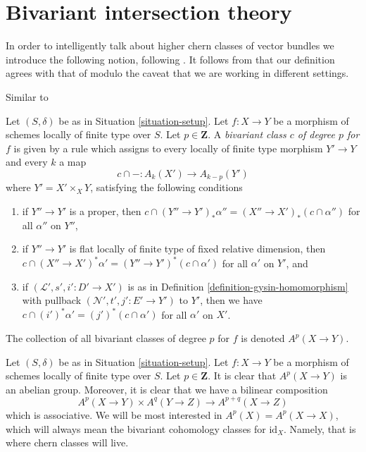 \section{Bivariant intersection theory}
\label{section-bivariant}

\noindent
In order to intelligently talk about higher chern classes of vector
bundles we introduce the following notion, following \cite{FM}.
It follows from \cite[Theorem 17.1]{F} that our definition agrees
with that of \cite{F} modulo the caveat that we are working in different
settings.

\begin{definition}
\label{definition-bivariant-class}
\begin{reference}
Similar to \cite[Definition 17.1]{F}
\end{reference}
Let $(S, \delta)$ be as in Situation \ref{situation-setup}.
Let $f : X \to Y$ be a morphism of schemes locally of finite type over $S$.
Let $p \in \mathbf{Z}$.
A {\it bivariant class $c$ of degree $p$ for $f$} is given by a rule
which assigns to every locally of finite type morphism $Y' \to Y$
and every $k$ a map
$$
c \cap - : A_k(X') \longrightarrow A_{k - p}(Y')
$$
where $Y' = X' \times_X Y$, satisfying the following conditions
\begin{enumerate}
\item if $Y'' \to Y'$ is a proper, then
$c \cap (Y'' \to Y')_*\alpha'' = (X'' \to X')_*(c \cap \alpha'')$
for all $\alpha''$ on $Y''$,
\item if $Y'' \to Y'$ is flat locally of finite type of
fixed relative dimension, then
$c \cap (X'' \to X')^*\alpha' = (Y'' \to Y')^*(c \cap \alpha')$
for all $\alpha'$ on $Y'$, and
\item if $(\mathcal{L}', s', i' : D' \to X')$ is as in
Definition \ref{definition-gysin-homomorphism}
with pullback $(\mathcal{N}', t', j' : E' \to Y')$ to $Y'$,
then we have $c \cap (i')^*\alpha' = (j')^*(c \cap \alpha')$
for all $\alpha'$ on $X'$.
\end{enumerate}
The collection of all bivariant classes of degree $p$ for $f$ is
denoted $A^p(X \to Y)$.
\end{definition}

\noindent
Let $(S, \delta)$ be as in Situation \ref{situation-setup}. Let $f : X \to Y$
be a morphism of schemes locally of finite type over $S$. Let
$p \in \mathbf{Z}$. It is clear that $A^p(X \to Y)$ is an abelian group.
Moreover, it is clear that we have a bilinear composition
$$
A^p(X \to Y) \times A^q(Y \to Z) \to A^{p + q}(X \to Z)
$$
which is associative.
We will be most interested in $A^p(X) = A^p(X \to X)$, which will always mean
the bivariant cohomology classes for $\text{id}_X$. Namely, that is where
chern classes will live.

